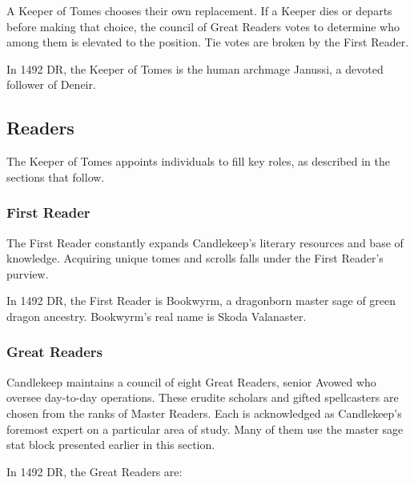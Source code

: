 \documentclass[10pt,a4paper,twoside,bg=print,twocolumn,openany,nodeprecatedcode]{dndbook}
\begin{document}
A Keeper of Tomes chooses their own replacement. If a Keeper dies or departs before making that choice, the council of Great Readers votes to determine who among them is elevated to the position. Tie votes are broken by the First Reader.

In 1492 DR, the Keeper of Tomes is the human archmage Janussi, a devoted follower of Deneir.

\subsection{Readers}
The Keeper of Tomes appoints individuals to fill key roles, as described in the sections that follow.

\subsubsection{First Reader}
The First Reader constantly expands Candlekeep's literary resources and base of knowledge. Acquiring unique tomes and scrolls falls under the First Reader's purview.

In 1492 DR, the First Reader is Bookwyrm, a dragonborn master sage of green dragon ancestry. Bookwyrm's real name is Skoda Valanaster.

\subsubsection{Great Readers}
Candlekeep maintains a council of eight Great Readers, senior Avowed who oversee day-to-day operations. These erudite scholars and gifted spellcasters are chosen from the ranks of Master Readers. Each is acknowledged as Candlekeep's foremost expert on a particular area of study. Many of them use the master sage stat block presented earlier in this section.

In 1492 DR, the Great Readers are:
\end{document}
